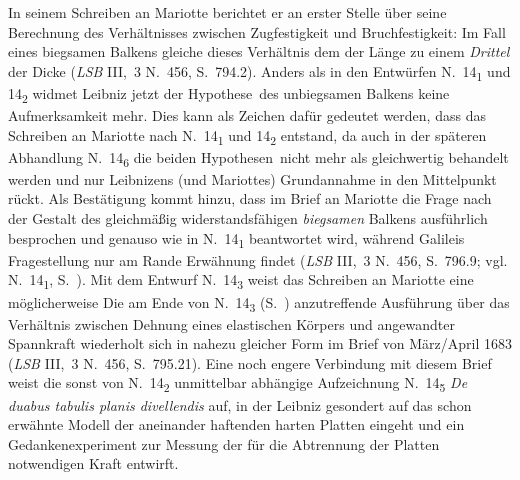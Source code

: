 In seinem Schreiben an Mariotte berichtet er an erster Stelle über seine Berechnung des Verhältnisses zwischen Zugfestigkeit und Bruchfestigkeit: Im Fall eines biegsamen Balkens gleiche dieses Verhältnis dem der Länge zu einem \textit{Drittel} der Dicke (\textit{LSB} III,~3 N.~456, S.~794.2\cite{01262}).
Anders als in den Entwürfen N.~14\textsubscript{1} und 14\textsubscript{2} widmet Leibniz jetzt der \glqq Hypothese\grqq\ des unbiegsamen Balkens keine Aufmerksamkeit mehr.
Dies kann als Zeichen dafür gedeutet werden, dass das Schreiben an Mariotte nach N.~14\textsubscript{1} und 14\textsubscript{2} entstand, da auch in der späteren Abhandlung N.~14\textsubscript{6} die beiden \glqq Hypothesen\grqq\ nicht mehr als gleichwertig behandelt werden und nur Leibnizens (und Mariottes) Grundannahme in den Mittelpunkt rückt.
Als Bestätigung kommt hinzu, dass im Brief an Mariotte die Frage nach der Gestalt des gleichmäßig widerstandsfähigen \textit{biegsamen} Balkens ausführlich besprochen und genauso wie in N.~14\textsubscript{1} beantwortet wird, während Galileis Fragestellung nur am Rande Erwähnung findet (\textit{LSB} III,~3 N.~456, S.~796.9\cite{01262}; vgl. N.~14\textsubscript{1}, S.~).
Mit dem Entwurf N.~14\textsubscript{3} %
weist das Schreiben an Mariotte eine möglicherweise 
\pend%
\newpage
\pstart\noindent
Die am Ende von N.~14\textsubscript{3} (S.~) anzutreffende Ausführung über das Verhältnis zwischen Dehnung eines elastischen Körpers und angewandter Spannkraft wiederholt sich in nahezu gleicher Form im Brief von März/April 1683 (\textit{LSB} III,~3 N.~456, S.~795.21).%
\pend%
\pstart%
Eine noch engere Verbindung mit diesem Brief %
weist die sonst von N.~14\textsubscript{2} unmittelbar abhängige Aufzeichnung N.~14\textsubscript{5} \textit{De duabus tabulis planis divellendis} auf,
in der Leibniz gesondert auf das schon erwähnte Modell der aneinander haftenden harten Platten eingeht und ein Gedankenexperiment zur Messung der für die Abtrennung der Platten notwendigen Kraft entwirft.
